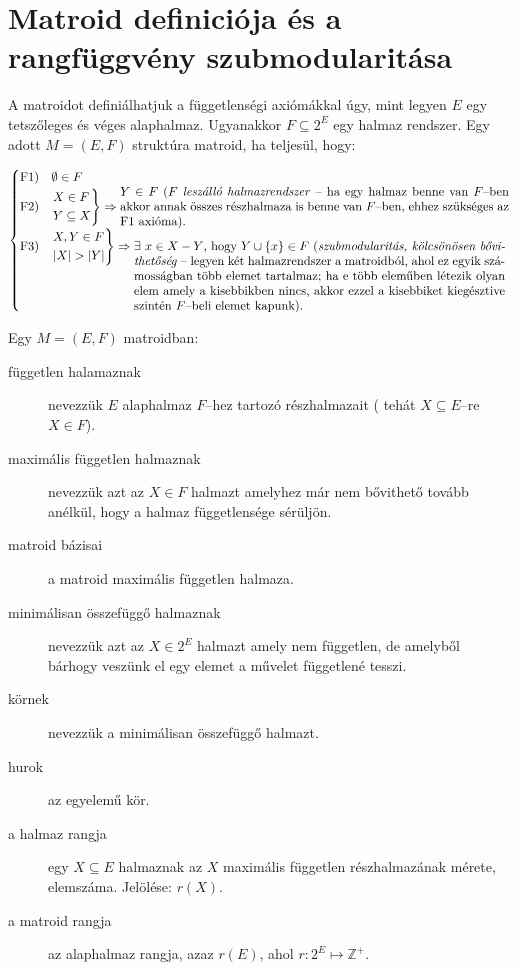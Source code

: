 \section{Matroid definiciója és a rangfüggvény szubmodularitása}

A matroidot definiálhatjuk a függetlenségi axiómákkal úgy, mint legyen $E$ egy
tetszőleges és véges alaphalmaz. Ugyanakkor $F \subseteq  2^E$ egy halmaz
rendszer. Egy adott $M=(E,F)$ struktúra matroid, ha teljesül, hogy:

\[
\begin{cases}
\mbox{F1}) &\emptyset \in F \\
\mbox{F2}) &\begin{rcases}
X \in F \\
Y \subseteq X
\end{rcases} \Rightarrow \parbox[L]{11cm}{$Y \in F$
($F$ \emph{leszálló halmazrendszer} -- ha egy halmaz benne van $F$--ben akkor annak összes
részhalmaza is benne van $F$--ben, ehhez szükséges az F$1$ axióma).
} \\
\mbox{F3}) &\begin{rcases}
X,Y \in F\\
|X| > |Y| \\
\end{rcases} \Rightarrow\parbox[t]{10.5cm}{ $\exists~x \in X-Y$,~hogy $Y \cup \{x\}
\in F~($\emph{szubmodularitás, kölcsönösen bővithetőség} -- legyen két halmazrendszer
a matroidból, ahol ez egyik számosságban több elemet tartalmaz; ha e több
eleműben létezik olyan elem amely a kisebbikben nincs, akkor ezzel a kisebbiket
kiegésztive szintén $F$--beli elemet kapunk).}
\end{cases}
\]

Egy $M=(E,F)$ matroidban:

\begin{description}
  \item[független halamaznak] nevezzük $E$ alaphalmaz $F$--hez tartozó
  részhalmazait ( tehát $X\subseteq E$--re $X \in F$).
  \item[maximális független halmaznak] nevezzük azt az $X \in F$ halmazt
  amelyhez már nem bővithető tovább anélkül, hogy a halmaz függetlensége
  sérüljön.
  \item[matroid bázisai] a matroid maximális független halmaza.
  \item[minimálisan összefüggő halmaznak] nevezzük azt az $X \in 2^E$ halmazt
  amely nem független, de amelyből bárhogy veszünk el egy elemet a művelet
  függetlené tesszi.
  \item[körnek] nevezzük a minimálisan összefüggő halmazt.
  \item[hurok] az egyelemű kör.
  \item[a halmaz rangja] egy $X\subseteq E$ halmaznak az $X$ maximális
  független részhalmazának mérete, elemszáma. Jelölése: $r(X)$.
  \item[a matroid rangja] az alaphalmaz rangja, azaz $r(E)$, ahol $r:2^E \mapsto \mathbb{Z}^+$.
\end{description}

